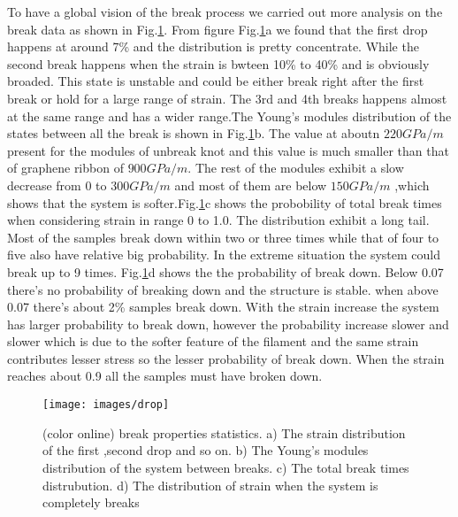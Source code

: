 \documentclass[%
 reprint,
 amsmath,amssymb,
 aps,
prb,
]{revtex4-1}
\begin{document}
To have a global vision of the break process we carried out more analysis on the break data as shown in Fig.\ref{fig:drop}. From figure Fig.\ref{fig:drop}a we found that the first drop happens at around 7\%  and the distribution is pretty concentrate. While the second break happens when the strain is bwteen 10\% to 40\% and is obviously broaded. This state is unstable and could be either break right after the first break or hold for a large range of strain. The 3rd and 4th breaks happens almost at the same range and has a wider range.The Young's modules distribution of the states between all the break is shown in Fig.\ref{fig:drop}b. The value at aboutn $220GPa/m$ present for the modules of unbreak knot and this value is much smaller than that of graphene ribbon of $900GPa/m$. The rest of the modules exhibit a slow decrease from 0 to $300GPa/m$ and most of them are below  $150GPa/m$ ,which shows that the system is softer.Fig.\ref{fig:drop}c shows the probobility of total break times when considering strain in range 0 to 1.0. The distribution exhibit a long tail.  Most of the samples break down within two or three times while that of four to five also have relative big probability. In the extreme situation the system could break up to 9 times. Fig.\ref{fig:drop}d shows the the probability of break down. Below 0.07 there's no probability of breaking down and the structure is stable. when above 0.07 there's about 2\% samples break down. With the strain increase the system has larger probability to break down, however the probability increase slower and slower which is due to the softer feature of the filament and the same strain contributes lesser
stress so the lesser probability of break down. When the strain reaches about 0.9 all the samples must have broken down.

\begin{figure}[b]
  \texttt{[image: images/drop]}
  \caption{\label{fig:drop}  (color online) break properties statistics. a) The strain distribution of the first ,second drop and so on. b) The Young's modules distribution of the system between breaks. c) The total break times distrubution. d) The distribution of strain when the system is completely breaks}

\end{figure}
\end{document}
